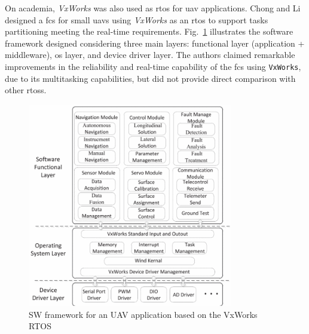 On academia, \emph{VxWorks} was also used as \gls{rtos} for \gls{uav}
applications. Chong and Li~\cite{vxworksFCS} designed a \gls{fcs} for small
\glspl{uav} using \emph{VxWorks} as an \gls{rtos} to support tasks partitioning
meeting the real-time requirements. Fig.~\ref{fig:vxworks-sw-arch} illustrates
the software framework designed considering three main layers: functional layer
(application + middleware), \gls{os} layer, and device driver layer. The authors
claimed remarkable improvements in the reliability and real-time capability of
the \gls{fcs} using \lstinline{VxWorks}, due to its multitasking capabilities, but did not provide direct comparison with
other \glspl{rtos}.

\begin{figure}[!hbt]
  \centering
  \includegraphics[width=0.8\textwidth]{./img/png/vxworks-sw-arch.png} 
  \caption[SW framework for an UAV application based on the VxWorks
    RTOS~]{SW framework for an UAV application based on the VxWorks
    RTOS~\cite{vxworksFCS}\footnotemark}%
  \label{fig:vxworks-sw-arch}
\end{figure}
%
%



